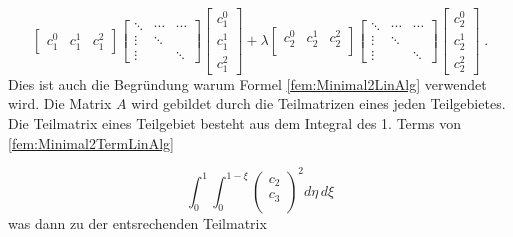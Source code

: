 \begin{equation}
\begin{bmatrix}
c_1^0 &  c_1^1 &  c_1^2  
\end{bmatrix}
\begin{bmatrix}
\ddots & \cdots &  \cdots    \\
\vdots & \ddots &   \\
\vdots &  & \ddots
\end{bmatrix}
\begin{bmatrix}
c_1^0  \\
c_1^1 \\
c_1^2
\end{bmatrix}
+
\lambda
\begin{bmatrix}
c_2^0 &  c_2^1 &  c_2^2    \\   
\end{bmatrix}
\begin{bmatrix}
\ddots & \cdots &  \cdots    \\
\vdots & \ddots &   \\
\vdots &  & \ddots
\end{bmatrix}
\begin{bmatrix}
c_2^0  \\
c_2^1 \\
c_2^2
\end{bmatrix} \; .
	\label{fem:MatrixKoeffizient}
\end{equation}
Dies ist auch die Begründung warum Formel \eqref{fem:Minimal2LinAlg} verwendet wird.
Die Matrix $A$ wird gebildet durch die Teilmatrizen eines jeden Teilgebietes. Die Teilmatrix eines Teilgebiet besteht  aus dem Integral des 1. Terms von \eqref{fem:Minimal2TermLinAlg} 

\begin{equation}
			\int_0^1 \int_0^{1 - \xi} \left( \begin{array}{c} c_2 \\ c_3\\	
\end{array} \right)^2 d\eta \, d\xi
			\label{fem:Minimal2LinAlgA}
\end{equation}
was dann zu der entsrechenden Teilmatrix


